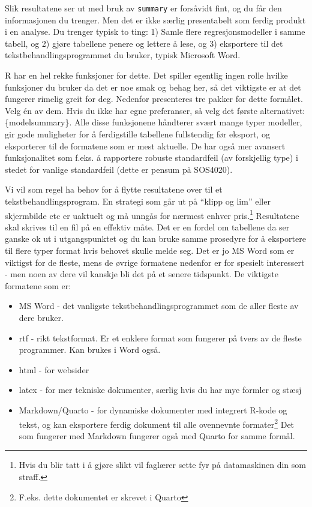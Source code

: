 \documentclass[
  letterpaper,
  DIV=11,
  numbers=noendperiod]{scrreprt}
\providecommand{\tightlist}{%
  \setlength{\itemsep}{0pt}\setlength{\parskip}{0pt}}\usepackage{longtable,booktabs,array}
\theoremstyle{definition}
\theoremstyle{remark}
\begin{document}
Slik resultatene ser ut med bruk av \texttt{summary} er forsåvidt fint,
og du får den informasjonen du trenger. Men det er ikke særlig
presentabelt som ferdig produkt i en analyse. Du trenger typisk to ting:
1) Samle flere regresjonsmodeller i samme tabell, og 2) gjøre tabellene
penere og lettere å lese, og 3) eksportere til det
tekstbehandlingsprogrammet du bruker, typisk Microsoft Word.

R har en hel rekke funksjoner for dette. Det spiller egentlig ingen
rolle hvilke funksjoner du bruker da det er noe smak og behag her, så
det viktigste er at det fungerer rimelig greit for deg. Nedenfor
presenteres tre pakker for dette formålet. Velg én av dem. Hvis du ikke
har egne preferanser, så velg det første alternativet: \{modelsummary\}.
Alle disse funksjonene håndterer svært mange typer modeller, gir gode
muligheter for å ferdigstille tabellene fullstendig før eksport, og
eksporterer til de formatene som er mest aktuelle. De har også mer
avansert funksjonalitet som f.eks. å rapportere robuste standardfeil (av
forskjellig type) i stedet for vanlige standardfeil (dette er pensum på
SOS4020).

Vi vil som regel ha behov for å flytte resultatene over til et
tekstbehandlingsprogram. En strategi som går ut på ``klipp og lim''
eller skjermbilde etc er uaktuelt og må unngås for nærmest enhver
pris.\footnote{Hvis du blir tatt i å gjøre slikt vil faglærer sette fyr
  på datamaskinen din som straff.} Resultatene skal skrives til en fil
på en effektiv måte. Det er en fordel om tabellene da ser ganske ok ut i
utgangspunktet og du kan bruke samme prosedyre for å eksportere til
flere typer format hvis behovet skulle melde seg. Det er jo MS Word som
er viktigst for de fleste, mens de øvrige formatene nedenfor er for
spesielt interessert - men noen av dere vil kanskje bli det på et senere
tidspunkt. De viktigste formatene som er:

\begin{itemize}
\tightlist
\item
  MS Word - det vanligste tekstbehandlingsprogrammet som de aller fleste
  av dere bruker.
\item
  rtf - rikt tekstformat. Er et enklere format som fungerer på tvers av
  de fleste programmer. Kan brukes i Word også.
\item
  html - for websider
\item
  latex - for mer tekniske dokumenter, særlig hvis du har mye formler og
  stæsj
\item
  Markdown/Quarto - for dynamiske dokumenter med integrert R-kode og
  tekst, og kan eksportere ferdig dokument til alle ovennevnte
  formater\footnote{F.eks. dette dokumentet er skrevet i Quarto} Det som
  fungerer med Markdown fungerer også med Quarto for samme formål.
\end{itemize}
\end{document}
